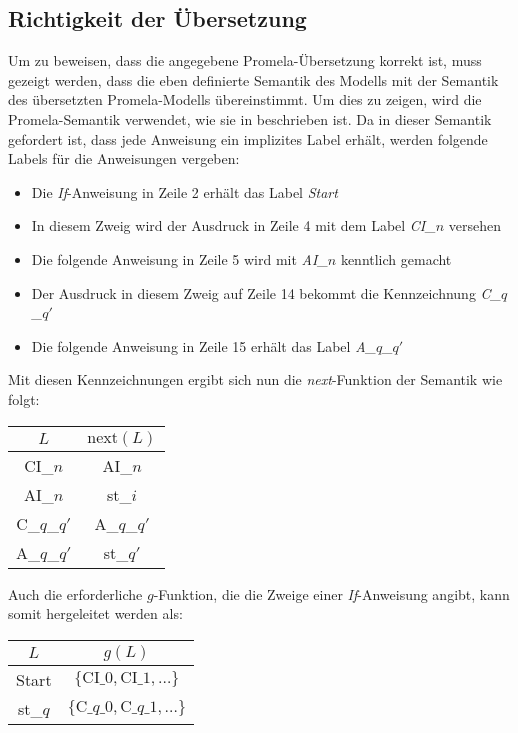 \subsection{Richtigkeit der Übersetzung}
Um zu beweisen, dass die angegebene Promela-Übersetzung korrekt ist, muss gezeigt werden, dass die eben definierte Semantik des Modells mit der Semantik des übersetzten Promela-Modells übereinstimmt.
Um dies zu zeigen, wird die Promela-Semantik verwendet, wie sie in \cite{Gallardo04formalaspects} beschrieben ist.
Da in dieser Semantik gefordert ist, dass jede Anweisung ein implizites Label erhält, werden folgende Labels für die Anweisungen vergeben:
\begin{itemize}
\item Die \emph{If}-Anweisung in Zeile 2 erhält das Label \emph{Start}
\item In diesem Zweig wird der Ausdruck in Zeile 4 mit dem Label \emph{CI\_$n$} versehen
\item Die folgende Anweisung in Zeile 5 wird mit \emph{AI\_$n$} kenntlich gemacht
\item Der Ausdruck in diesem Zweig auf Zeile 14 bekommt die Kennzeichnung \emph{C\_$q$\_$q'$}
\item Die folgende Anweisung in Zeile 15 erhält das Label \emph{A\_$q$\_$q'$}
\end{itemize}

Mit diesen Kennzeichnungen ergibt sich nun die \emph{next}-Funktion der Semantik wie folgt:

\begin{tabular}{|c|c|}
  \hline
  $L$ & $\textrm{next}(L)$\\
  \hline
  CI\_$n$ & AI\_$n$\\
  AI\_$n$ & st\_$i$\\
  C\_$q$\_$q'$ & A\_$q$\_$q'$\\
  A\_$q$\_$q'$ & st\_$q'$\\
  \hline
\end{tabular}

Auch die erforderliche $g$-Funktion, die die Zweige einer \emph{If}-Anweisung angibt, kann somit hergeleitet werden als:

\begin{tabular}{|c|c|}
  \hline
  $L$ & $g(L)$\\
  \hline
  Start & $\{ \textrm{CI\_}0,\textrm{CI\_}1,\dots \}$\\
  st\_$q$ & $\{ \textrm{C\_}q\textrm{\_}0,\textrm{C\_}q\textrm{\_}1,\dots \}$\\
  \hline
\end{tabular}

